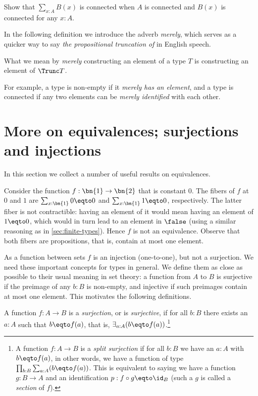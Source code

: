 \begin{xca}\label{xca:connected-trivia-1}
  Show that $\sum_{x:A}B(x)$ is connected when $A$ is connected
  and $B(x)$ is connected for any $x:A$.
\end{xca}

In the following definition we introduce the adverb \emph{merely}, which serves as a quicker way to say \emph{the propositional truncation of}
in English speech.

\begin{definition}\label{def:merely}
  What we mean by \emph{merely} constructing an element of a type $T$ is constructing an element of $\Trunc T$.
\end{definition}

For example, a type is non-empty if it \emph{merely has an element}, and a type is connected if any two elements can be
\emph{merely identified} with each other.


\section{More on equivalences; surjections and injections}
\label{sec:more-on-equivalences}

In this section we collect a number of useful results on equivalences.

Consider the function $f:\bn{1}\to\bn{2}$ that is constant $0$.
The fibers of $f$ at $0$ and $1$ are $\sum_{x:\bn{1}} 0\eqto 0$
and $\sum_{x:\bn{1}} 1\eqto 0$, respectively.
The latter fiber is not contractible: having an element
of it would mean having an element of $1\eqto 0$,
which would in turn lead to an element in $\false$
(using a similar reasoning as in \cref{sec:finite-types}).
Hence $f$ is not an equivalence.
Observe that both fibers are propositions,
that is, contain at most one element.

As a function between sets
$f$ is an injection (one-to-one), but not a surjection.
We need these important concepts for types in general.
We define them as close as possible to their
usual meaning in set theory: a function from $A$ to $B$ is
surjective if the preimage of any $b:B$ is non-empty,
and injective if such preimages contain at most one element.
This motivates the following definitions.

\begin{definition}\label{def:surjection}
A function $f:A\to B$ is a \emph{surjection}, or is \emph{surjective},
if for all $b:B$ there exists an $a:A$ such that $b \eqto f(a)$,
that is, $\exists_{a:A} (b \eqto f(a))$.\footnote{%
  A function $f:A\to B$ is a \emph{split surjection}
  if for all $b:B$ we have an $a:A$ with $b \eqto f(a)$,
  in other words, we have a function of type
  $\prod_{b:B} \sum_{a:A} (b \eqto f(a))$.
  This is equivalent to saying we have a function
  $g:B\to A$ and an identification $p: f\circ g \eqto \id_B$
  (such a $g$ is called a \emph{section} of $f$).}
\end{definition}

